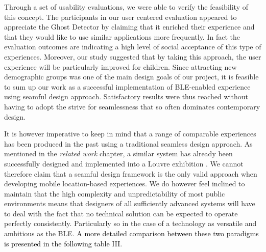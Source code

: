 \documentclass[prodmode,acmtomm]{acmsmall}
\begin{document}
Through a set of usability evaluations, we were able to verify the feasibility of this concept. The participants in our user centered evaluation appeared to appreciate the Ghost Detector by claiming that it enriched their experience and that they would like to use similar applications more frequently. In fact the evaluation outcomes are indicating a high level of social acceptance of this type of experiences. Moreover, our study suggested that by taking this approach, the user experience will be particularly improved for children. Since attracting new demographic groups was one of the main design goals of our project, it is feasible to sum up our work as a successful implementation of BLE-enabled experience using seamful design approach. Satisfactory results were thus reached without having to adopt the strive for seamlessness that so often dominates contemporary design. 

It is however imperative to keep in mind that a range of comparable experiences has been produced in the past using a traditional seamless design approach. As mentioned in the \textit{related work} chapter, a similar system has already been successfully designed and implemented into a Louvre exhibition \cite{Arnaudov2008}. We cannot therefore claim that a seamful design framework is the only valid approach when developing mobile location-based experiences. We do however feel inclined to maintain that the high complexity and unpredictability of most public environments means that designers of all sufficiently advanced systems will have to deal with the fact that no technical solution can be expected to operate perfectly consistently. Particularly so in the case of a technology as versatile and ambitious as the BLE. \textcolor{black}{A more detailed comparison between these two paradigms is presented in the following table III. }
\end{document}
